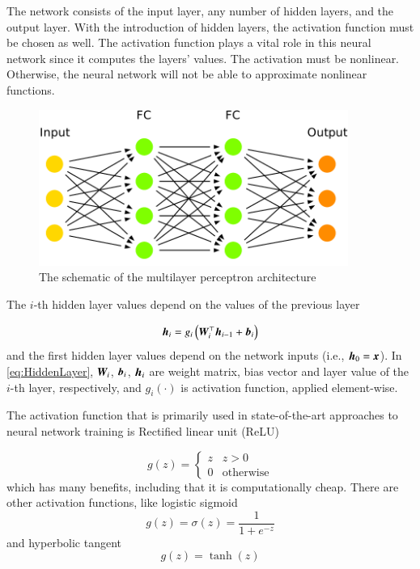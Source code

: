 The network consists of the input layer, any number of hidden layers, and the output layer. With the introduction of hidden layers, the activation function must be chosen as well. The activation function plays a vital role in this neural network since it computes the layers' values. The activation must be nonlinear. Otherwise, the neural network will not be able to approximate nonlinear functions.

\begin{figure}
    \centering
    \includegraphics[width=0.9\textwidth]{slike/arch_mlp.pdf}
    \caption{The schematic of the multilayer perceptron architecture}
    \label{fig:MLPArch}
\end{figure}

The $i$-th hidden layer values depend on the values of the previous layer

\begin{equation}
    {\bm{h}}_i = g_i\left({\bm{W}}_i^{\top}{\bm{h}}_{i-1}+{\bm{b}}_i \right)
    \label{eq:HiddenLayer}
\end{equation}
and the first hidden layer values depend on the network inputs (i.e., ${\bm{h}}_0={\bm{x}}$). In \cref{eq:HiddenLayer}, ${\bm{W}}_i$, ${\bm{b}}_i$, ${\bm{h}}_i$ are weight matrix, bias vector and layer value of the $i$-th layer, respectively, and $g_i(\cdot)$ is activation function, applied element-wise.

The activation function that is primarily used in state-of-the-art approaches to neural network training is Rectified linear unit (ReLU)

\[
    g(z)=\begin{cases}
    z & z>0\\
    0 & \textrm{otherwise}
    \end{cases}
\]
which has many benefits, including that it is computationally cheap. There are other activation functions, like logistic sigmoid
\[
    g(z)=\sigma(z)=\frac{1}{1+e^{-z}}
    \label{eq:Sigmoid}
\]
and hyperbolic tangent
\[
    g(z)=\tanh(z)
\]

